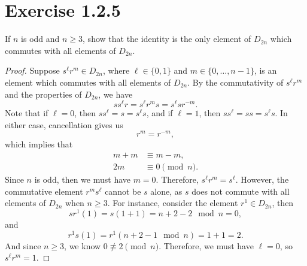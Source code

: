 \documentclass[12pt]{article}
\newenvironment{problem}
    {\begin{lrbox}{\mybox}\begin{minipage}{\textwidth-10pt}}
    {\end{minipage}\end{lrbox}\framebox[6.5in]{\usebox{\mybox}}}
\begin{document}
\section*{Exercise 1.2.5}
\begin{problem}
    If $n$ is odd and $n\geq 3$, show that the identity is the only element of $D_{2n}$ which commutes with all elements of $D_{2n}$.
\end{problem}

\begin{proof}
    Suppose $s^\ell r^m\in D_{2n}$, where $\ell\in\{0,1\}$ and $m\in\{0,\dots,n-1\}$, is an element which commutes with all elements of $D_{2n}$. By the commutativity of $s^\ell r^m$ and the properties of $D_{2n}$, we have
    \[ss^\ell r = s^\ell r^m s = s^\ell sr^{-m}.\]
    Note that if $\ell=0$, then $ss^\ell = s = s^\ell s$, and if $\ell=1$, then $ss^\ell = ss = s^\ell s$. In either case, cancellation gives us
    \[r^m = r^{-m},\]
    which implies that
    \begin{align*}
        m+m &\equiv m-m, \\
        2m &\equiv 0 \pmod{n}.
    \end{align*}
    Since $n$ is odd, then we must have $m=0$. Therefore, $s^\ell r^m = s^\ell$. However, the commutative element $r^ms^\ell$ cannot be $s$ alone, as $s$ does not commute with all elements of $D_{2n}$ when $n\geq 3$. For instance, consider the element $r^1\in D_{2n}$, then
    \[sr^1(1) = s(1+1) = n+2-2 \mod n = 0,\]
    and
    \[r^1s(1) = r^1(n+2-1 \mod n) = 1+1 = 2.\]
    And since $n\geq 3$, we know $0\not\equiv 2\pmod n$. Therefore, we must have $\ell=0$, so $s^\ell r^m = 1$.
    
\end{proof}
\end{document}
